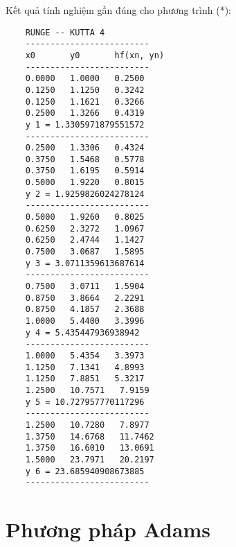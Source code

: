 Kết quả tính nghiệm gần đúng cho phương trình (*):
\begin{lstlisting}
	RUNGE -- KUTTA 4
	-------------------------
	x0       y0       hf(xn, yn)
	-------------------------
	0.0000   1.0000   0.2500
	0.1250   1.1250   0.3242
	0.1250   1.1621   0.3266
	0.2500   1.3266   0.4319
	y 1 = 1.3305971879551572
	-------------------------
	0.2500   1.3306   0.4324
	0.3750   1.5468   0.5778
	0.3750   1.6195   0.5914
	0.5000   1.9220   0.8015
	y 2 = 1.9259826024278124
	-------------------------
	0.5000   1.9260   0.8025
	0.6250   2.3272   1.0967
	0.6250   2.4744   1.1427
	0.7500   3.0687   1.5895
	y 3 = 3.0711359613687614
	-------------------------
	0.7500   3.0711   1.5904
	0.8750   3.8664   2.2291
	0.8750   4.1857   2.3688
	1.0000   5.4400   3.3996
	y 4 = 5.435447936938942
	-------------------------
	1.0000   5.4354   3.3973
	1.1250   7.1341   4.8993
	1.1250   7.8851   5.3217
	1.2500   10.7571   7.9159
	y 5 = 10.727957770117296
	-------------------------
	1.2500   10.7280   7.8977
	1.3750   14.6768   11.7462
	1.3750   16.6010   13.0691
	1.5000   23.7971   20.2197
	y 6 = 23.685940908673885
	-------------------------
\end{lstlisting}

\section{Phương pháp Adams}
